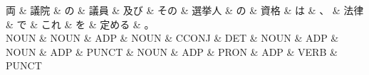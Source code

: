 \documentclass[tikz,border=5pt]{standalone}
\begin{document}
\normalsize
\begin{dependency}[edge unit distance=12.0pt]
    \begin{deptext}[column sep=1em]
        両 \& 議院 \& の \& 議員 \& 及び \& その \& 選挙人 \& の \& 資格 \& は \& 、 \& 法律 \& で \& これ \& を \& 定める \& 。\\
        NOUN \& NOUN \& ADP \& NOUN \& CCONJ \& DET \& NOUN \& ADP \& NOUN \& ADP \& PUNCT \& NOUN \& ADP \& PRON \& ADP \& VERB \& PUNCT\\
    \end{deptext}
\end{dependency}
\end{document}
